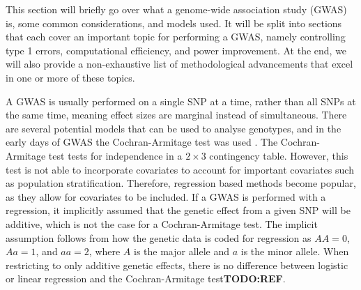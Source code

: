 


This section will briefly go over what a genome-wide association study (GWAS) is, some common considerations, and models used. It will be split into sections that each cover an important topic for performing a GWAS, namely controlling type 1 errors, computational efficiency, and power improvement. At the end, we will also provide a non-exhaustive list of methodological advancements that excel in one or more of these topics. 

A GWAS is usually performed on a single SNP at a time, rather than all SNPs at the same time, meaning effect sizes are marginal instead of simultaneous. There are several potential models that can be used to analyse genotypes, and in the early days of GWAS the Cochran-Armitage test \cite{cochran1954some,armitageTest} was used \cite{balding2006tutorial}. The Cochran-Armitage test tests for independence in a $ 2\times 3 $ contingency table. However, this test is not able to incorporate covariates to account for important covariates such as population stratification. Therefore, regression based methods become popular, as they allow for covariates to be included. If a GWAS is performed with a regression, it implicitly assumed that the genetic effect from a given SNP will be additive, which is not the case for a Cochran-Armitage test. The implicit assumption follows from how the genetic data is coded for regression as $ AA = 0 $, $ Aa = 1 $, and $ aa = 2 $, where $ A $ is the major allele and $ a $ is the minor allele\cite{zeng2015statistical}. When restricting to only additive genetic effects, there is no difference between logistic or linear regression and the Cochran-Armitage test\textbf{TODO:REF}. 

